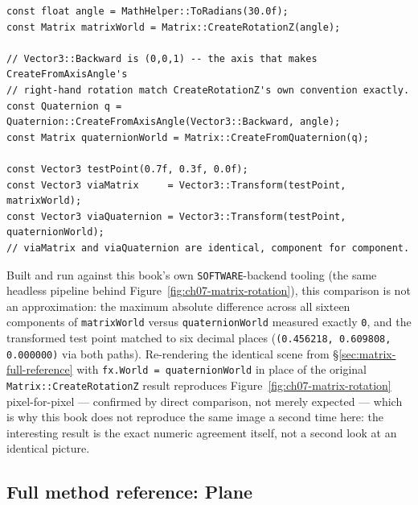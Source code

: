 \begin{lstlisting}
const float angle = MathHelper::ToRadians(30.0f);
const Matrix matrixWorld = Matrix::CreateRotationZ(angle);

// Vector3::Backward is (0,0,1) -- the axis that makes CreateFromAxisAngle's
// right-hand rotation match CreateRotationZ's own convention exactly.
const Quaternion q = Quaternion::CreateFromAxisAngle(Vector3::Backward, angle);
const Matrix quaternionWorld = Matrix::CreateFromQuaternion(q);

const Vector3 testPoint(0.7f, 0.3f, 0.0f);
const Vector3 viaMatrix     = Vector3::Transform(testPoint, matrixWorld);
const Vector3 viaQuaternion = Vector3::Transform(testPoint, quaternionWorld);
// viaMatrix and viaQuaternion are identical, component for component.
\end{lstlisting}

Built and run against this book's own \texttt{SOFTWARE}-backend tooling (the same headless
pipeline behind Figure~\ref{fig:ch07-matrix-rotation}), this comparison is not an
approximation: the maximum absolute difference across all sixteen components of
\texttt{matrixWorld} versus \texttt{quaternionWorld} measured exactly \texttt{0}, and the
transformed test point matched to six decimal places
(\texttt{(0.456218, 0.609808, 0.000000)} via both paths). Re-rendering the identical scene
from \S\ref{sec:matrix-full-reference} with \texttt{fx.World = quaternionWorld} in place of
the original \texttt{Matrix::CreateRotationZ} result reproduces
Figure~\ref{fig:ch07-matrix-rotation} pixel-for-pixel --- confirmed by direct comparison, not
merely expected --- which is why this book does not reproduce the same image a second time
here: the interesting result is the exact numeric agreement itself, not a second look at an
identical picture.

\subsection{Full method reference: Plane}

